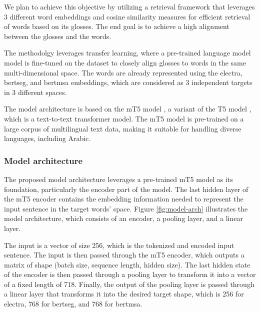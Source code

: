 \documentclass[12pt]{article}
\begin{document}
We plan to achieve this objective by utilizing a retrieval framework that leverages 3 different word embeddings and cosine similarity measures for efficient retrieval of words based on its glosses. The end goal is to achieve a high alignment between the glosses and the words.

The methodolgy leverages transfer learning, where a pre-trained language model model is fine-tuned on the dataset to closely align glosses to words in the same multi-dimensional space. The words are already represented using the electra, bertseg, and bertmsa embeddings, which are considered as 3 independent targets in 3 different spaces.

The model architecture is based on the mT5 model \cite{Linting2021}, a variant of the T5 model \cite{Raffel2019}, which is a text-to-text transformer model. The mT5 model is pre-trained on a large corpus of multilingual text data, making it suitable for handling diverse languages, including Arabic.

\subsubsection{Model architecture}

The proposed model architecture leverages a pre-trained mT5 model as its foundation, particularly the encoder part of the model. The last hidden layer of the mT5 encoder contains the embedding information needed to represent the input sentence in the target words’ space. Figure \ref{fig:model-arch} illustrates the model architecture, which consists of an encoder, a pooling layer, and a linear layer.

The input is a vector of size 256, which is the tokenized and encoded input sentence. The input is then passed through the mT5 encoder, which outputs a matrix of shape (batch size, sequence length, hidden size). The last hidden state of the encoder is then passed through a pooling layer to transform it into a vector of a fixed length of 718. Finally, the output of the pooling layer is passed through a linear layer that transforms it into the desired target shape, which is 256 for electra, 768 for bertseg, and 768 for bertmsa.
\end{document}

